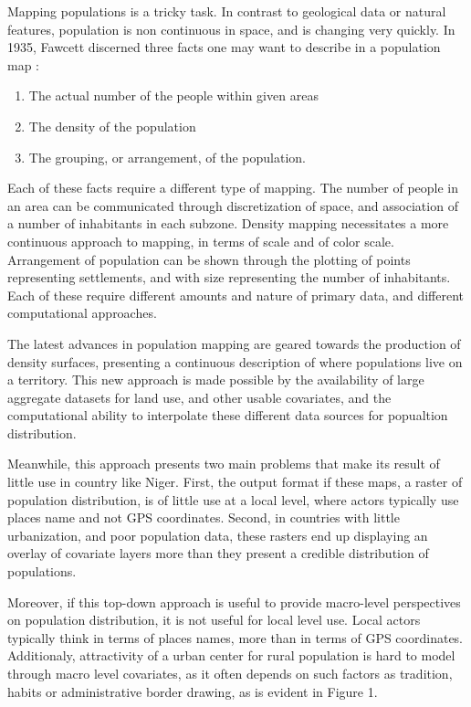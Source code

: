 Mapping populations is a tricky task. In contrast to geological data or natural features, population is non continuous in space, and is changing very quickly. In 1935, Fawcett discerned three facts one may want to describe in a population map\cite{fawcett1935population} :
\begin{enumerate}
	\item The actual number of the people within given areas
	\item The density of the population
	\item The grouping, or arrangement, of the population.
\end{enumerate}
Each of these facts require a different type of mapping. The number of people in an area can be communicated through discretization of space, and association of a number of inhabitants in each subzone. Density mapping necessitates a more continuous approach to mapping, in terms of scale and of color scale. Arrangement of population can be shown through the plotting of points representing settlements, and with size representing the number of inhabitants. Each of these require different amounts and nature of primary data, and different computational approaches.

The latest advances in population mapping are geared towards the production of density surfaces, presenting a continuous description of where populations live on a territory\cite{linard2012population}. This new approach is made possible by the availability of large aggregate datasets for land use, and other usable covariates\cite{linard2011assessing}, and the computational ability to interpolate these  different data sources for popualtion distribution\cite{stevens2015disaggregating}.

Meanwhile, this approach presents two main problems that make its result of little use in country like Niger. First, the output format if these maps, a raster of population distribution, is of little use at a local level, where actors typically use places name and not GPS coordinates. Second, in countries with little urbanization, and poor population data, these rasters end up displaying an overlay of covariate layers more than they present a credible distribution of populations.

Moreover, if this top-down approach is useful to provide macro-level perspectives on population distribution, it is not useful for local level use. Local actors typically think in terms of places names, more than in terms of GPS coordinates. Additionaly, attractivity of a urban center for rural population is hard to model through macro level covariates, as it often depends on such factors as tradition, habits or administrative border drawing, as is evident in Figure 1.

